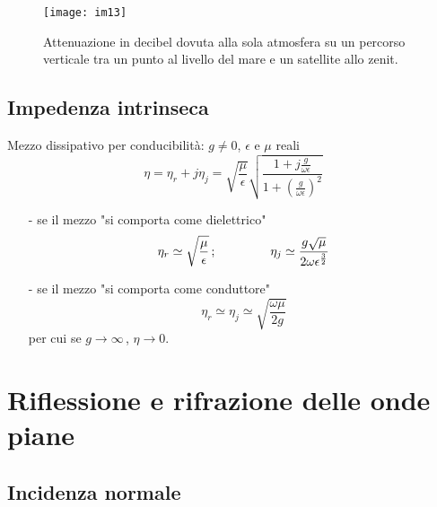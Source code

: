 \documentclass[a4paper]{article}
\begin{document}
\begin{figure}[ht] 
\centering
\texttt{[image: im13]}
\caption{Attenuazione in decibel dovuta alla sola atmosfera su un percorso verticale tra un punto al livello del mare e un satellite allo zenit.}
\end{figure}
\subsection*{Impedenza intrinseca}
Mezzo dissipativo per conducibilità: $g\neq 0$, $\epsilon$ e $\mu$ reali
\begin{equation*}
\eta=\eta_r+j\eta_j=\sqrt{\frac{\mu}{\epsilon}}\sqrt{\frac{1+j\frac{g}{\omega\epsilon}}{1+\left(\frac{g}{\omega\epsilon}\right)^2}}
\end{equation*}
\begin{itemize}
\item[-] se il mezzo "si comporta come dielettrico"
\begin{equation*}
\eta_r\simeq\sqrt{\frac{\mu}{\epsilon}}\,;\hspace{15mm}\eta_j\simeq\frac{g\sqrt{\mu}}{2\omega\epsilon^{\frac{3}{2}}}
\end{equation*}
\item[-] se il mezzo "si comporta come conduttore"
\begin{equation*}
\eta_r\simeq\eta_j\simeq\sqrt{\frac{\omega\mu}{2g}}
\end{equation*}
per cui se $g\rightarrow\infty\,$, $\eta\rightarrow0$.
\end{itemize}
\section{Riflessione e rifrazione delle onde piane}
\subsection*{Incidenza normale}
\end{document}

